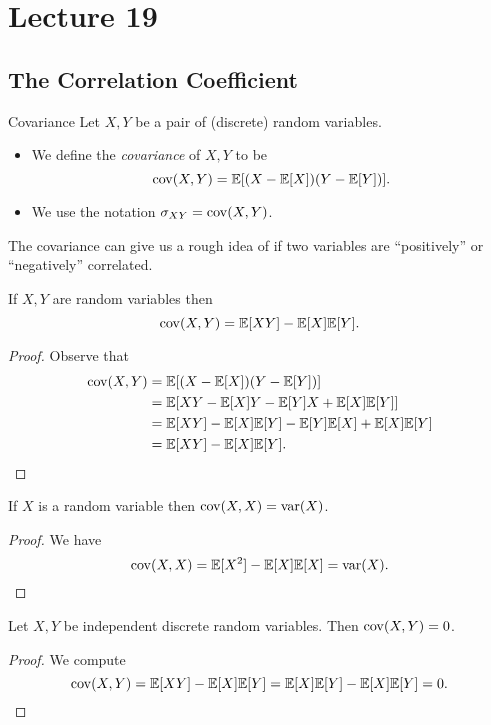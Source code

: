 \documentclass[class=article, crop=false]{standalone}
\begin{document}
  \section{Lecture 19}
  \subsection{The Correlation Coefficient}
  \begin{definition}{Covariance}
    Let $X, Y$ be a pair of (discrete) random variables.
    \begin{itemize}
      \item We define the \emph{covariance} of $X, Y$ to be
      \[
        \operatorname{cov}(X, Y) = \mathbb{E}[(X - \mathbb{E}[X])(Y - \mathbb{E}[Y])].
      \]
      \item We use the notation $\sigma_{XY} = \operatorname{cov}(X, Y)$.
    \end{itemize}
  \end{definition}
  \begin{note}{}
    The covariance can give us a rough idea of if two variables are ``positively'' or ``negatively'' correlated.
  \end{note}
  \begin{theorem}{}
    If $X, Y$ are random variables then
    \[
      \operatorname{cov}(X, Y) = \mathbb{E}[XY] - \mathbb{E}[X]\mathbb{E}[Y].
    \]
    \begin{proof}
      Observe that
      \begin{align*}
        \operatorname{cov}(X, Y) &= \mathbb{E}[(X - \mathbb{E}[X])(Y - \mathbb{E}[Y])] \\
                   &= \mathbb{E}[XY - \mathbb{E}[X]Y - \mathbb{E}[Y]X + \mathbb{E}[X]\mathbb{E}[Y]] \\
                   &= \mathbb{E}[XY] - \mathbb{E}[X]\mathbb{E}[Y] - \mathbb{E}[Y]\mathbb{E}[X] + \mathbb{E}[X]\mathbb{E}[Y] \\
                   &= \mathbb{E}[XY] - \mathbb{E}[X]\mathbb{E}[Y].
      \end{align*}
    \end{proof}
  \end{theorem}
  \begin{theorem}{}
    If $X$ is a random variable then $\operatorname{cov}(X, X) = \operatorname{var}(X)$.
    \begin{proof}
      We have
      \[
        \operatorname{cov}(X, X) = \mathbb{E}[X^2] - \mathbb{E}[X]\mathbb{E}[X] = \operatorname{var}(X).
      \]
    \end{proof}
  \end{theorem}
  \begin{theorem}{}
    Let $X, Y$ be independent discrete random variables. Then $\operatorname{cov}(X, Y) = 0$.
    \begin{proof}
      We compute
      \[
        \operatorname{cov}(X, Y) = \mathbb{E}[XY] - \mathbb{E}[X]\mathbb{E}[Y] = \mathbb{E}[X]\mathbb{E}[Y] - \mathbb{E}[X]\mathbb{E}[Y] = 0.
      \]
    \end{proof}
  \end{theorem}
\end{document}
